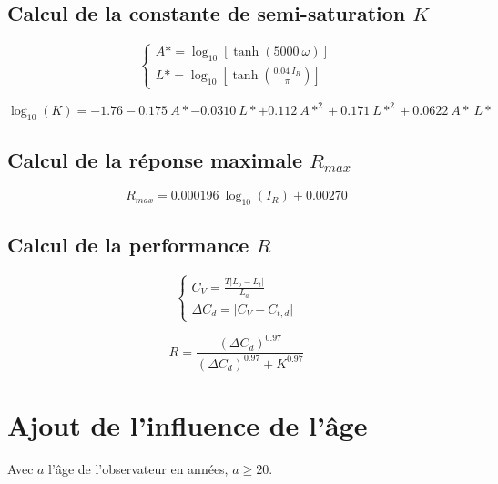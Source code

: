 	\subsection*{Calcul de la constante de semi-saturation $K$}	
	\begin{equation}
		\begin{cases}
			A\ast = \log_{10} \left[ \tanh(5000~\omega) \right]\\
			L\ast = \log_{10} \left[ \tanh \left( \frac{0.04~I_R}{\pi} \right) \right]
		\end{cases}
		\label{eq:anxe_step_20}
	\end{equation}
	
	\begin{equation}
		\log_{10}(K) = -1.76 -0.175~A\ast - 0.0310~L\ast + 0.112~A\ast^2 + 0.171~L\ast^2 + 0.0622~A\ast~L\ast
		\label{eq:anxe_step_21}
	\end{equation}
	
	\subsection*{Calcul de la réponse maximale $R_{max}$}	
	\begin{equation}
		R_{max} = 0.000196~\log_{10}(I_R) + 0.00270
		\label{eq:anxe_step_30}
	\end{equation}
	
	\subsection*{Calcul de la performance $R$}	
	\begin{equation}
		\begin{cases}
		C_V = \frac{T \vert L_b - L_t \vert}{L_a}\\		
		\Delta C_d = \vert C_V - C_{t,d} \vert
		\end{cases}
		\label{eq:anxe_step_40}
	\end{equation}
	
	\begin{equation}
		R = \frac{(\Delta C_d)^{0.97}}{(\Delta C_d)^{0.97} + K^{0.97}}
		\label{eq:anxe_step_41}
	\end{equation}
	
	\section*{Ajout de l'influence de l'âge}	
	\par Avec $a$ l'âge de l'observateur en années, $a \geq 20$.	
	
